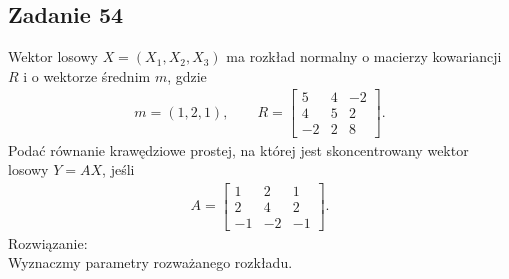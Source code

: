 \subsection*{Zadanie 54}
Wektor losowy $ X=(X_1,X_2,X_3) $ ma rozkład normalny o macierzy kowariancji $ R $ i o wektorze średnim $ m $, gdzie
\begin{gather*}
m=(1,2,1),\qquad
R=\begin{bmatrix}
	5  & 4 & -2 \\
	4  & 5 & 2  \\
	-2 & 2 & 8
\end{bmatrix}.
\end{gather*}
Podać równanie krawędziowe prostej, na której jest skoncentrowany wektor losowy $ Y=AX $, jeśli
\begin{gather*}
A=
\begin{bmatrix}
	1  & 2  & 1  \\
	2  & 4  & 2  \\
	-1 & -2 & -1
\end{bmatrix}.
\end{gather*}
\newpage
Rozwiązanie:\\
Wyznaczmy parametry rozważanego rozkładu.
